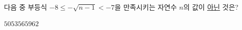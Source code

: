 다음 중 부등식 $-8\le -\sqrt{n-1}<-7$을 만족시키는 자연수 $n$의 값이 \underline{아닌} 것은?
\begin{choices32}{$50$}{$53$}{$56$}{$59$}{$62$}\end{choices32}
